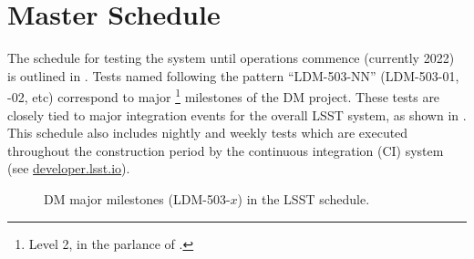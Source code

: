 \section{Master Schedule\label{sect:schedule}}

The schedule for testing the system until operations commence (currently 2022) is outlined in .
Tests named following the pattern ``LDM-503-NN'' (LDM-503-01, -02, etc) correspond to major \footnote{Level 2, in the parlance of .} milestones of the DM project.
These tests are closely tied to major integration events for the overall LSST system, as shown in .
This schedule also includes nightly and weekly tests which are executed throughout the construction period by the continuous integration (CI) system (see \url{developer.lsst.io}).



\begin{figure}[htbp]

\begin{center}



\end{center}

\caption{DM major milestones (LDM-503-$x$) in the LSST schedule. \label{fig:schedule}}
\end{figure}
